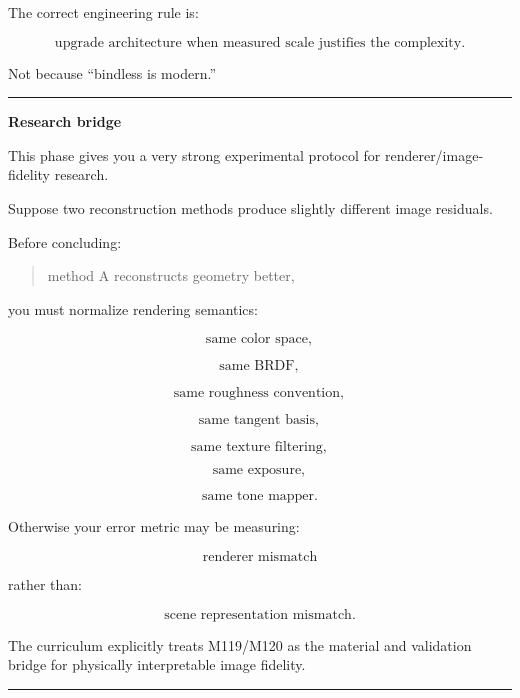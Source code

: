 The correct engineering rule is:

\[
\boxed{
\text{upgrade architecture when measured scale justifies the complexity}.
}
\]

Not because ``bindless is modern.''

\begin{center}\rule{0.5\linewidth}{0.5pt}\end{center}

\textbf{Research bridge}

This phase gives you a very strong experimental protocol for renderer/image-fidelity research.

Suppose two reconstruction methods produce slightly different image residuals.

Before concluding:

\begin{quote}
method A reconstructs geometry better,
\end{quote}

you must normalize rendering semantics:

\[
\text{same color space},
\]

\[
\text{same BRDF},
\]

\[
\text{same roughness convention},
\]

\[
\text{same tangent basis},
\]

\[
\text{same texture filtering},
\]

\[
\text{same exposure},
\]

\[
\text{same tone mapper}.
\]

Otherwise your error metric may be measuring:

\[
\text{renderer mismatch}
\]

rather than:

\[
\text{scene representation mismatch}.
\]

The curriculum explicitly treats M119/M120 as the material and validation bridge for physically interpretable image fidelity.

\begin{center}\rule{0.5\linewidth}{0.5pt}\end{center}

